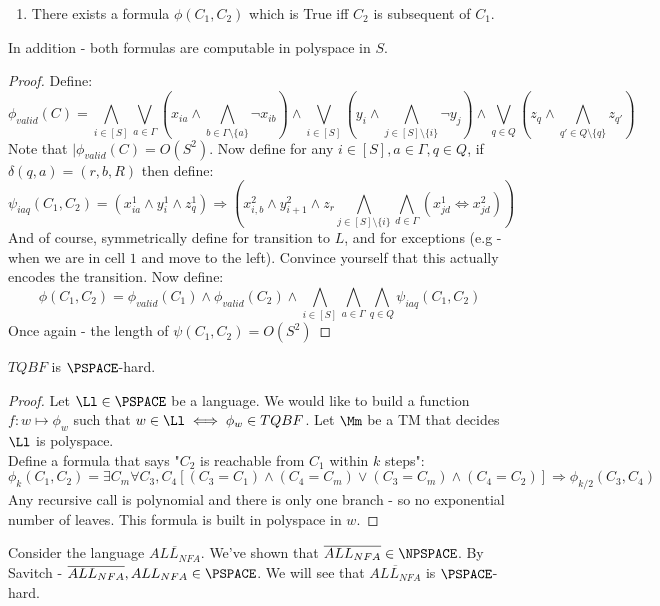 \begin{example}
\begin{blueBox}
\begin{thm}
\begin{enumerate}
			\item There exists a formula $\phi(C_1,C_2)$ which is True iff $C_2$ is subsequent of $C_1$.
		\end{enumerate}
	In addition - both formulas are computable in polyspace in $S$.
	\end{thm}
\end{blueBox}
\begin{proof}
	Define:
	\[
	\phi_{valid}(C) = \bigwedge_{i\in [S]}\bigvee_{a\in \Gamma}\left(x_{ia}\land \bigwedge_{b\in \Gamma\setminus\{a\}}\neg x_{ib}\right)\land\bigvee_{i\in [S]}\left(y_i\land \bigwedge_{j\in [S]\setminus \{i\}}\neg y_j\right)\land\bigvee_{q\in Q}\left(z_q\land \bigwedge_{q'\in Q\setminus\{q\}}z_{q'}\right)
	\]
	Note that $|\phi_{valid}(C) = O(S^2)$. Now define for any $i\in [S], a\in \Gamma, q\in Q$, if $\delta(q,a) = (r,b,R)$ then define:
	\[
	\psi_{iaq}(C_1,C_2) = (x^1_{ia}\land y^1_i\land z^1_q)\Rightarrow (x^2_{i,b}\land y^2_{i+1}\land z_r\bigwedge_{j\in [S]\setminus \{i\}}\bigwedge_{d\in \Gamma}(x^1_{jd}\iff x^2_{jd}))
	\]
	And of course, symmetrically define for transition to $L$, and for exceptions (e.g - when we are in cell $1$ and move to the left).
	Convince yourself that this actually encodes the transition. Now define:
	\[
	\phi(C_1, C_2) = \phi_{valid}(C_1)\land \phi_{valid}(C_2) \land \bigwedge_{i\in [S]}\bigwedge_{a\in \Gamma}\bigwedge_{q\in Q}\psi_{iaq}(C_1,C_2)
	\]
	Once again - the length of $\psi(C_1, C_2) = O(S^2)$
\end{proof}
\begin{claim}
	$TQBF$ is $\PSPACE$-hard.
\end{claim}
\begin{proof}
	Let $\Ll\in \PSPACE$ be a language. We would like to build a function $f:w\mapsto\phi_{w}$ such that $w\in \Ll\iff \phi_w\in TQBF$. Let $\Mm$ be a TM that decides $\Ll$ is polyspace. \\
	Define a formula that says "$C_2$ is reachable from $C_1$ within $k$ steps": 
	\[
	\phi_k(C_1,C_2) = \exists C_m\forall C_3,C_4\left[(C_3 = C_1)\land (C_4 = C_m)\lor (C_3=C_m)\land(C_4 = C_2)\right]\Rightarrow \phi_{k/2}(C_3,C_4)
	\]
	Any recursive call is polynomial and there is only one branch - so no exponential number of leaves. This formula is built in polyspace in $w$.
\end{proof}
\end{example}
\begin{example}
	Consider the language $\overline{ALL_{NFA}}$. We've shown that $\overline{ALL_{NFA}}\in \NPSPACE$. By Savitch - $\overline{ALL_{NFA}}, ALL_{NFA}\in \PSPACE$. We will see that $\overline{ALL_{NFA}}$ is $\PSPACE$-hard.
\end{example}
